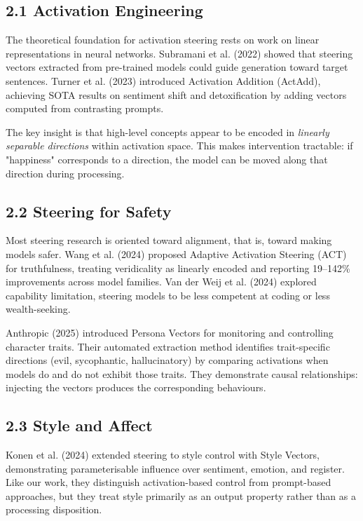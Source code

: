 \documentclass[11pt,a4paper]{article}
\begin{document}
\subsection*{2.1 Activation Engineering}

The theoretical foundation for activation steering rests on work on linear representations in neural networks. Subramani et al. (2022) showed that steering vectors extracted from pre-trained models could guide generation toward target sentences. Turner et al. (2023) introduced Activation Addition (ActAdd), achieving SOTA results on sentiment shift and detoxification by adding vectors computed from contrasting prompts.

The key insight is that high-level concepts appear to be encoded in \emph{linearly separable directions} within activation space. This makes intervention tractable: if "happiness" corresponds to a direction, the model can be moved along that direction during processing.

\subsection*{2.2 Steering for Safety}

Most steering research is oriented toward alignment, that is, toward making models safer. Wang et al. (2024) proposed Adaptive Activation Steering (ACT) for truthfulness, treating veridicality as linearly encoded and reporting 19--142\% improvements across model families. Van der Weij et al. (2024) explored capability limitation, steering models to be less competent at coding or less wealth-seeking.

Anthropic (2025) introduced Persona Vectors for monitoring and controlling character traits. Their automated extraction method identifies trait-specific directions (evil, sycophantic, hallucinatory) by comparing activations when models do and do not exhibit those traits. They demonstrate causal relationships: injecting the vectors produces the corresponding behaviours.

\subsection*{2.3 Style and Affect}

Konen et al. (2024) extended steering to style control with Style Vectors, demonstrating parameterisable influence over sentiment, emotion, and register. Like our work, they distinguish activation-based control from prompt-based approaches, but they treat style primarily as an output property rather than as a processing disposition.
\end{document}
